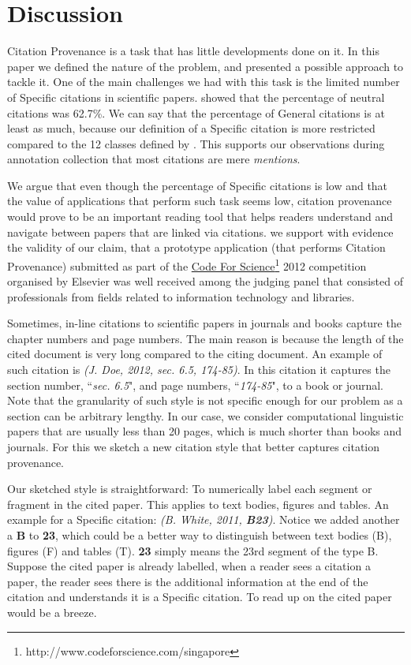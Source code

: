 \chapter{Discussion}
\label{discussion}
Citation Provenance is a task that has little developments done on it. In this paper we defined the nature of the problem, and presented a possible approach to tackle it. One of the main challenges we had with this task is the limited number of Specific citations in scientific papers.  showed that the percentage of neutral citations was 62.7\%. We can say that the percentage of General citations is at least as much, because our definition of a Specific citation is more restricted compared to the 12 classes defined by . This supports our observations during annotation collection that most citations are mere {\it mentions}.

We argue that even though the percentage of Specific citations is low and that the value of applications that perform such task seems low, citation provenance would prove to be an important reading tool that helps readers understand and navigate between papers that are linked via citations. we support with evidence the validity of our claim, that a prototype application (that performs Citation Provenance) submitted as part of the \url{Code For Science}\footnote{http://www.codeforscience.com/singapore} 2012 competition organised by Elsevier was well received among the judging panel that consisted of professionals from fields related to information technology and libraries.

Sometimes, in-line citations to scientific papers in journals and books capture the chapter numbers and page numbers. The main reason is because the length of the cited document is very long compared to the citing document. An example of such citation is \textit{(J. Doe, 2012, sec. 6.5, 174-85)}. In this citation it captures the section number, ``\textit{sec. 6.5}", and page numbers, ``\textit{174-85}", to a book or journal. Note that the granularity of such style is not specific enough for our problem as a section can be arbitrary lengthy. In our case, we consider computational linguistic papers that are usually less than 20 pages, which is much shorter than books and journals. For this we sketch a new citation style that better captures citation provenance.

Our sketched style is straightforward: To numerically label each segment or fragment in the cited paper. This applies to text bodies, figures and tables. An example for a Specific citation: \textit{(B. White, 2011, \textbf{B23})}. Notice we added another a \textbf{B} to \textbf{23}, which could be a better way to distinguish between text bodies (B), figures (F) and tables (T). \textbf{23} simply means the 23rd segment of the type B. Suppose the cited paper is already labelled, when a reader sees a citation a paper, the reader sees there is the additional information at the end of the citation and understands it is a Specific citation. To read up on the cited paper would be a breeze.